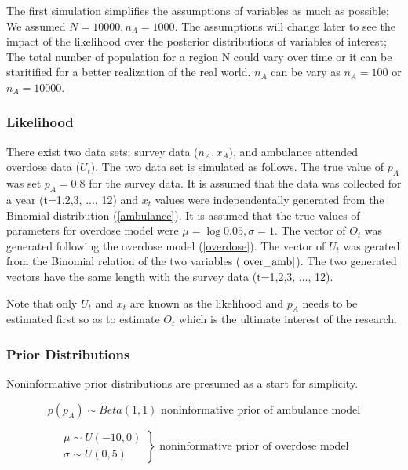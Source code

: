 \documentclass[
10pt, %
a4paper, %
oneside, %
headinclude,footinclude, %
BCOR5mm, %
]{scrartcl}
\begin{document}
\normalsize 
The first simulation simplifies the assumptions of variables as much as possible; We assumed $N= 10000, n_{A}=1000$. The assumptions will change later to see the impact of the likelihood over the posterior distributions of variables of interest; The total number of population for a region N could vary over time or it can be staritified for a better realization of the real world. $n_A$ can be vary as $n_{A}=100$ or $n_{A}=10000$.  \\

\subsubsection{Likelihood}

\normalsize 
There exist two data sets; survey data ($n_A, x_A$), and ambulance attended overdose data ($U_t$). The two data set is simulated as follows.
The true value of $p_A$ was set $p_A=0.8$ for the survey data.
It is assumed that the data was collected for a year (t=1,2,3, ..., 12) and 
$x_t$ values were independentally generated from the Binomial distribution (\ref{ambulance}). It is assumed that the true values of parameters for overdose model were $\mu=\log0.05, \sigma=1$.
The vector of $O_t$ was generated following the overdose model (\ref{overdose}). The vector of $U_t$ was gerated from the Binomial relation of the two variables ($\ref{over_amb}$). The two generated vectors have the same length with the survey data (t=1,2,3, ..., 12).

Note that only $U_t$ and $x_t$ are known as the likelihood and $p_A$ needs to be estimated first so as to estimate $O_t$ which is the ultimate interest of the research.\\


\subsubsection{Prior Distributions}
\normalsize Noninformative prior distributions are presumed as a start for simplicity. 

\begin{equation}
\label{nonin_prior_amb}
p(p_A) \sim Beta(1,1)
\text{			noninformative prior of ambulance model}
\end{equation} 

\begin{equation}
\label{noninprior_over}
\left.\begin{aligned}
\mu \sim U(-10,0)\\
\sigma \sim U(0,5)
\end{aligned}\right\} 
\text{			noninformative prior of overdose model}
\end{equation}
\end{document}
